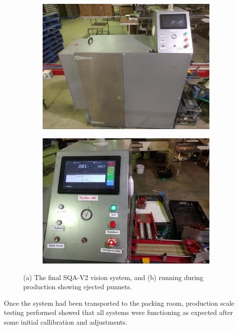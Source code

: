 \documentclass[fleqn,twoside,12pt]{report}
\begin{document}
\begin{figure}[t]
	\centering
	\begin{subfigure}{0.5\textwidth}
		\centering
		\includegraphics[width=0.95\linewidth]{SQA2_complete.jpg}
		\caption{}
		\label{fig:SQA2_complete}
	\end{subfigure}%
	\begin{subfigure}{0.5\textwidth}
		\centering
		\includegraphics[width=0.95\linewidth]{action_shot.jpg}
		\caption{}
		\label{fig:action_shot}
	\end{subfigure}%
	\caption{(a) The final SQA-V2 vision system, and (b) running during production showing ejected punnets.}
	\label{}
\end{figure}

Once the system had been transported to the packing room, production scale testing performed showed that all systems were functioning as expected after some initial callibration and adjustments. 
\end{document}
